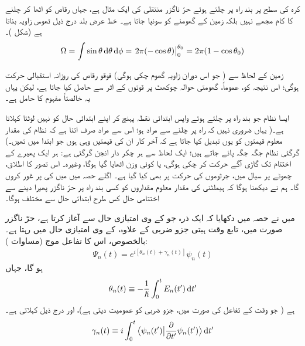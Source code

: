 کرہ کی سطح پر بند راہ پر چلتے ہوئے حرّ ناگزر منتقلی کی ایک مثال  ہے، جہاں رقاص کو اٹھا کر چلنے کا کام مجھے نہیں بلکہ زمین کے گھومنے کو سونپا جاتا ہے۔ خط عرض بلد  درج ذیل ٹھوس زاویہ بناتا ہے (شکل )۔ 
\begin{align}\label{مساوات_حر_ٹھوس_زاویہ}
\Omega = \int \sin \theta \dif \theta \dif \phi =\left. 2\pi (- \cos \theta)\right\vert_0^{\theta_0} = 2 \pi (1 - \cos \theta_0)
\end{align}
%



زمین کے لحاظ سے ( جو اس دوران  زاویہ گھوم چکی ہوگی) فوقو رقاص کی روزانہ استقبالی حرکت  ہوگی؛ اس نتیجہ کو، عموماً، گھومتی حوالہ چوکھٹ پر  قوتوں کے اثر سے حاصل کیا جاتا ہے، لیکن یہاں یہ خالصتاً  مفہوم کا حامل ہے۔ 

 ایسا نظام جو بند راہ پر چلتے ہوئے واپس ابتدائی نقطہ پہنچ کر اپنے ابتدائی حال کو نہیں لوٹتا  کہلاتا ہے۔( یہاں ضروری نہیں کہ راہ پر چلنے سے مراد  ہو؛ اس سے مراد صرف اتنا ہے کہ نظام کی مقدار معلوم قیمتوں کو یوں تبدیل کیا جاتا ہے کہ آخر کار ان کی قیمتیں وہی ہوں جو ابتدا میں تھیں۔) گرگٹی نظام جگہ جگہ پائے جاتے ہیں؛ ایک لحاظ سے ہر چکر دار انجن گرگٹی ہے: ہر ایک پھیرے کے اختتام تک گاڑی آگے حرکت کر چکی ہوگی، یا کوئی وزن اٹھایا گیا ہوگا، وغیرہ۔ اس تصور کا اطلاق، چھوٹے  پر سیال میں، جرثوموں کی حرکت پر بھی کیا گیا ہے۔ اگلے حصہ میں میں  کی  پر غور کروں گا۔ ہم نے دیکھنا ہوگا کہ ہیملٹنی کی مقدار معلوم مقداروں کو کسی بند راہ پر حرّ ناگزر پھیرا دینے سے اختتامی حال کس طرح ابتدائی حال سے مختلف ہوگا۔ 


میں نے حصہ  میں دکھایا کہ ایک ذرہ جو  کے  وی امتیازی حال سے آغاز کرتا ہے، حرّ ناگزر صورت میں، تابع وقت ہیتی جزو ضربی کے علاوہ،  کے  وی امتیازی حال میں رہتا ہے۔ بالخصوص، اس کا تفاعل موج (مساوات ):
\begin{align}
\Psi_n (t) = e^{i[\theta_n (t) + \gamma_n (t)]} \psi_n (t)
\end{align} 
ہو گا، جہاں 
\begin{align}\label{مساوات_حر_درست_روپ}
\theta_n (t) \equiv - \frac{1}{\hslash} \int_0^t E_n (t') \dif t'
\end{align}
  ہے ( جو وقت کے تفاعل  کی صورت میں، جزو ضربی  کو عمومیت دیتی ہے)، اور درج ذیل  کہلاتی ہے۔
\begin{align}
\gamma_n(t)\equiv i\int_0^t \big\langle \psi_n(t')\big|\frac{\partial}{\partial t'}\psi_n(t')\big \rangle \dif t'
\end{align}

